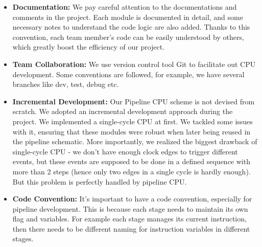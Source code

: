 \documentclass[a4paper,12pt]{article}
\begin{document}
\begin{itemize}
    
    
    \item \textbf{Documentation:} We pay careful attention to the documentations and comments in the project. Each module is documented in detail, and some necessary notes to understand the code logic are also added. Thanks to this convention, each team member's code can be easily understood by others, which greatly boost the efficiency of our project.
    
    \item \textbf{Team Collaboration:} We use version control tool Git to facilitate out CPU development. Some conventions are followed, for example, we have several branches like dev, test, debug etc.

    \item \textbf{Incremental Development:} Our Pipeline CPU scheme is not devised from scratch. We adopted an incremental development approach during the project. We implemented a single-cycle CPU at first. We tackled some issues with it,  ensuring that these modules were robust when later being reused in the pipeline schematic. More importantly, we realized the biggest drawback of single-cycle CPU - we don't have enough clock edges to trigger different events, but these events are supposed to be done in a defined sequence with more than 2 steps (hence only two edges in a single cycle is hardly enough). But this problem is perfectly handled by pipeline CPU.

    \item \textbf{Code Convention:} It's important to have a code convention, especially for pipeline development. This is because each stage needs to maintain its own flag and variables. For example each stage manages its current instruction, then there needs to be different naming for instruction variables in different stages.

\end{itemize}
\end{document}
